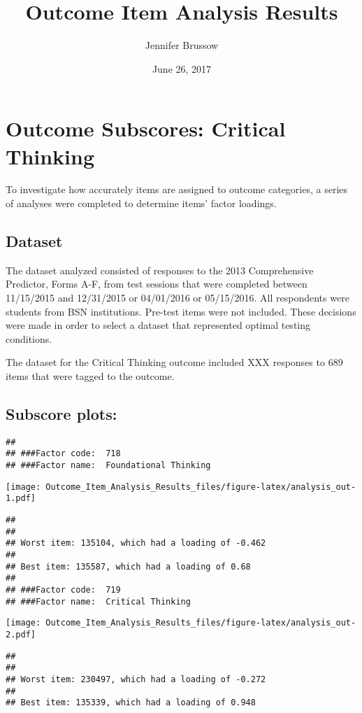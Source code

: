 \documentclass[]{article}
\title{Outcome Item Analysis Results}
\author{Jennifer Brussow}
\date{June 26, 2017}
\begin{document}
\maketitle

\section{Outcome Subscores: Critical
Thinking}\label{outcome-subscores-critical-thinking}

To investigate how accurately items are assigned to outcome categories,
a series of analyses were completed to determine items' factor loadings.

\subsection{Dataset}\label{dataset}

The dataset analyzed consisted of responses to the 2013 Comprehensive
Predictor, Forms A-F, from test sessions that were completed between
11/15/2015 and 12/31/2015 or 04/01/2016 or 05/15/2016. All respondents
were students from BSN institutions. Pre-test items were not included.
These decisions were made in order to select a dataset that represented
optimal testing conditions.

The dataset for the Critical Thinking outcome included XXX responses to
689 items that were tagged to the outcome.

\subsection{Subscore plots:}\label{subscore-plots}

\begin{verbatim}
## 
## ###Factor code:  718
## ###Factor name:  Foundational Thinking
\end{verbatim}

\texttt{[image: Outcome\_Item\_Analysis\_Results\_files/figure-latex/analysis\_out-1.pdf]}

\begin{verbatim}
## 
## 
## Worst item: 135104, which had a loading of -0.462
## 
## Best item: 135587, which had a loading of 0.68
## 
## ###Factor code:  719
## ###Factor name:  Critical Thinking
\end{verbatim}

\texttt{[image: Outcome\_Item\_Analysis\_Results\_files/figure-latex/analysis\_out-2.pdf]}

\begin{verbatim}
## 
## 
## Worst item: 230497, which had a loading of -0.272
## 
## Best item: 135339, which had a loading of 0.948
\end{verbatim}
\end{document}
